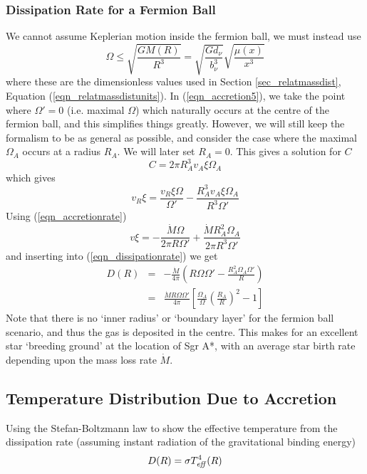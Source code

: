 \subsubsection{Dissipation Rate for a Fermion Ball}
We cannot assume Keplerian motion inside the fermion ball, we must instead use
\begin{equation}
	\Omega \leq \sqrt{\frac{GM(R)}{R^3}} = \sqrt{\frac{Gd_\nu}{b_\nu^3}} \sqrt{\frac{\mu(x)}{x^3}}
	\label{eqn_nonkeplerian}
\end{equation}
where these are the dimensionless values used in Section \ref{sec_relatmassdist}, Equation (\ref{eqn_relatmassdistunits}). In
(\ref{eqn_accretion5}), we take the point where $\Omega '=0$ (i.e. maximal $\Omega$) which naturally occurs at the centre of the fermion
ball, and this simplifies things greatly. However, we will still keep the formalism to be as general as possible, and consider the case
where the maximal $\Omega_A$ occurs at a radius $R_A$. We will later set $R_A=0$. This gives a solution for $C$
\begin{equation}
	C=2\pi R_A^3 v_A \xi \Omega_A
	\label{eqn_solnofcfermion}
\end{equation}
which gives
\begin{equation}
	v_R\xi = \frac{v_R\xi \Omega}{\Omega '} - \frac{R_A^3 v_A \xi \Omega_A}{R^3 \Omega '}
	\label{eqn_accretion5withsolnofcfermion}
\end{equation}
Using (\ref{eqn_accretionrate})
\begin{equation}
	v\xi = -\frac{\dot{M}\Omega}{2\pi R \Omega '} + \frac{\dot{M}R_A^2\Omega_A}{2\pi R^3\Omega '}
	\label{eqn_dissipationarb1}
\end{equation}
and inserting into (\ref{eqn_dissipationrate}) we get
\begin{eqnarray}
	D(R)&=&-\frac{\dot{M}}{4\pi}\left(R\Omega \Omega ' - \frac{R_A^2 \Omega_A \Omega '}{R}\right) \nonumber \\
	&=&\frac{\dot{M}R\Omega \Omega '}{4\pi} \left[\frac{\Omega_A}{\Omega} \left(\frac{R_A}{R}\right)^2-1\right]
	\label{eqn_dissipationfb}
\end{eqnarray}
Note that there is no `inner radius' or `boundary layer' for the fermion ball scenario, and thus the gas is deposited in the centre.
This makes for an excellent star `breeding ground' at the location of Sgr A*, with an average star birth rate depending upon the mass
loss rate $\dot{M}$.

\subsection{Temperature Distribution Due to Accretion}
Using the Stefan-Boltzmann law to show the effective temperature from the dissipation rate (assuming instant radiation of the gravitational
binding energy)
\begin{equation}
	D(R)=\sigma T_{{\rm {\it eff}}}^4(R)
	\label{eqn_stefanboltzman}
\end{equation}

